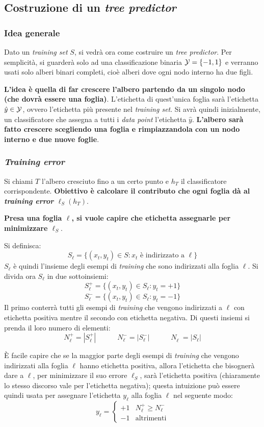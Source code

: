 \subsection{Costruzione di un \textit{tree predictor}}
\subsubsection{Idea generale}
Dato un \textit{training set} $S$, si vedrà ora come costruire un \textit{tree predictor}.
Per semplicità, si guarderà solo ad una classificazione binaria $\mathcal{Y}=\{-1,1\}$ e verranno
usati solo alberi binari completi, cioè alberi dove ogni nodo interno ha due figli.

\textbf{L'idea è quella di far crescere l'albero partendo da un singolo nodo (che dovrà 
essere una foglia)}. L'etichetta di quest'unica foglia sarà l'etichetta $\hat{y} \in \mathcal{Y}$,
ovvero l'etichetta più presente nel \textit{training set}. Si avrà quindi inizialmente, 
un classificatore che assegna a tutti i \textit{data point} l'etichetta $\hat{y}$.
\textbf{L'albero sarà fatto crescere scegliendo una foglia e rimpiazzandola con un nodo
interno e due nuove foglie}.

\subsubsection{\textit{Training error}}
Si chiami $T$ l'albero cresciuto fino a un certo punto e $h_T$ il classificatore
corrispondente. \textbf{Obiettivo è calcolare il contributo che ogni foglia dà al
\textit{training error} $\ell_S(h_T)$}.

\textbf{Presa una foglia $\ell$, si vuole capire che etichetta assegnarle per
minimizzare $\ell_S$}.

Si definisca:
$$ S_{\ell} = \{(x_t,y_t) \in S : \text{$x_t$ è indirizzato a $\ell$}\} $$
$S_{\ell}$ è quindi l'insieme degli esempi di \textit{training} che sono indirizzati
alla foglia $\ell$. Si divida ora $S_{\ell}$ in due sottoinsiemi:
$$ S_{\ell}^+ = \{(x_t,y_t) \in S_{\ell} : y_t=+1\} $$
$$ S_{\ell}^- = \{(x_t,y_t) \in S_{\ell} : y_t=-1\} $$
Il primo conterrà tutti gli esempi di \textit{training} che vengono indirizzati a $\ell$
con etichetta positiva mentre il secondo con etichetta negativa. Di questi insiemi
si prenda il loro numero di elementi:
$$ N_{\ell}^+ = |S_{\ell}^+| \qquad\quad N_{\ell}^- = |S_{\ell}^-| \qquad\quad
N_{\ell}^{\phantom{+}} = |S_{\ell}| $$

È facile capire che se la maggior parte degli esempi di \textit{training} che vengono
indirizzati alla foglia $\ell$ hanno etichetta positiva, allora l'etichetta che bisognerà 
dare a $\ell$, per minimizzare il suo errore $\ell_S$, sarà l'etichetta positiva 
(chiaramente lo stesso discorso vale per l'etichetta negativa); questa intuizione può
essere quindi usata per assegnare l'etichetta $y_{\ell}$ alla foglia $\ell$ nel seguente
modo:
$$ y_{\ell} = 
\begin{cases}
+1 &  N_{\ell}^+ \geq N_{\ell}^- \\
-1 & \text{altrimenti}
\end{cases}
$$

